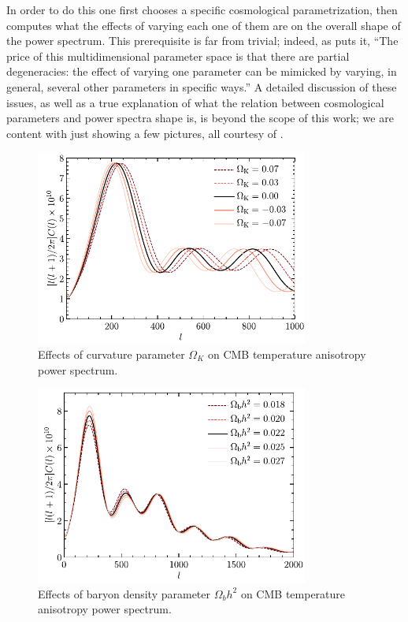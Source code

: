 In order to do this one first chooses a specific cosmological parametrization, then computes what the effects of varying each one of them are on the overall shape of the power spectrum. This prerequisite is far from trivial; indeed, as \cite{modern_cosmology} puts it, ``The price of this multidimensional parameter space is that there are partial degeneracies: the effect of varying one parameter can be mimicked by varying, in general, several other parameters in specific ways.''
A detailed discussion of these issues, as well as a true explanation of what the relation between cosmological parameters and power spectra shape is, is beyond the scope of this work; we are content with just showing a few pictures, all courtesy of \cite{modern_cosmology}.

\begin{figure}[H]
    \centering
    \includegraphics[width=0.8\textwidth]{img/curvatura.png}
    \caption{Effects of curvature parameter $\Omega_K$ on CMB temperature anisotropy power spectrum.}
\end{figure}

\begin{figure}[H]
    \centering
    \includegraphics[width=0.8\textwidth]{img/baryon_density.png}
    \caption{Effects of baryon density parameter $\Omega_b h^2$ on CMB temperature anisotropy power spectrum.}
\end{figure}

